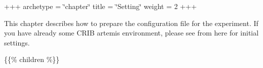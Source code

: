 +++ archetype = \char`\"{}chapter\char`\"{} title = \char`\"{}\+Setting\char`\"{} weight = 2 +++

This chapter describes how to prepare the configuration file for the experiment. If you have already some CRIB artemis environment, please see from here for initial settings.

\{\{\% children \%\}\} 